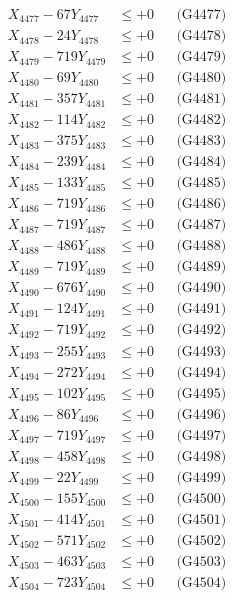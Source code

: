 \documentclass[a4paper,10pt]{article}
\begin{document}
{\begin{align}
X_{4477} - 67Y_{4477} &\leq +0 && \text{(G4477)} \\
X_{4478} - 24Y_{4478} &\leq +0 && \text{(G4478)} \\
X_{4479} - 719Y_{4479} &\leq +0 && \text{(G4479)} \\
X_{4480} - 69Y_{4480} &\leq +0 && \text{(G4480)} \\
\allowbreak
X_{4481} - 357Y_{4481} &\leq +0 && \text{(G4481)} \\
X_{4482} - 114Y_{4482} &\leq +0 && \text{(G4482)} \\
X_{4483} - 375Y_{4483} &\leq +0 && \text{(G4483)} \\
X_{4484} - 239Y_{4484} &\leq +0 && \text{(G4484)} \\
X_{4485} - 133Y_{4485} &\leq +0 && \text{(G4485)} \\
X_{4486} - 719Y_{4486} &\leq +0 && \text{(G4486)} \\
X_{4487} - 719Y_{4487} &\leq +0 && \text{(G4487)} \\
X_{4488} - 486Y_{4488} &\leq +0 && \text{(G4488)} \\
X_{4489} - 719Y_{4489} &\leq +0 && \text{(G4489)} \\
X_{4490} - 676Y_{4490} &\leq +0 && \text{(G4490)} \\
\allowbreak
X_{4491} - 124Y_{4491} &\leq +0 && \text{(G4491)} \\
X_{4492} - 719Y_{4492} &\leq +0 && \text{(G4492)} \\
X_{4493} - 255Y_{4493} &\leq +0 && \text{(G4493)} \\
X_{4494} - 272Y_{4494} &\leq +0 && \text{(G4494)} \\
X_{4495} - 102Y_{4495} &\leq +0 && \text{(G4495)} \\
X_{4496} - 86Y_{4496} &\leq +0 && \text{(G4496)} \\
X_{4497} - 719Y_{4497} &\leq +0 && \text{(G4497)} \\
X_{4498} - 458Y_{4498} &\leq +0 && \text{(G4498)} \\
X_{4499} - 22Y_{4499} &\leq +0 && \text{(G4499)} \\
X_{4500} - 155Y_{4500} &\leq +0 && \text{(G4500)} \\
\allowbreak
X_{4501} - 414Y_{4501} &\leq +0 && \text{(G4501)} \\
X_{4502} - 571Y_{4502} &\leq +0 && \text{(G4502)} \\
X_{4503} - 463Y_{4503} &\leq +0 && \text{(G4503)} \\
X_{4504} - 723Y_{4504} &\leq +0 && \text{(G4504)} \\

\end{align}}
\end{document}
